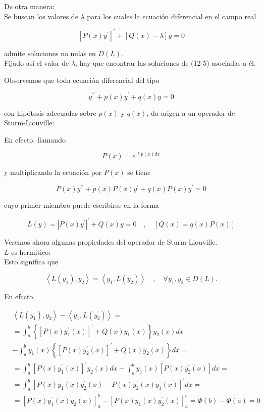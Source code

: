 \documentclass[10pt]{article}
\theoremstyle{plain}
\theoremstyle{definition}
\theoremstyle{remark}
\begin{document}
De otra manera:\\
Se buscan los valores de $\lambda$ para los cuales la ecuación diferencial en el campo real


\begin{equation*}
\left[P(x) y^{\prime}\right]^{\prime}+[Q(x)-\lambda] y=0 \tag{12-5}
\end{equation*}


admite soluciones no nulas en $D(L)$.\\
Fijado así el valor de $\lambda$, hay que encontrar las soluciones de (12-5) asociadas a él.

Observemos que toda ecuación diferencial del tipo

$$
y^{\prime \prime}+p(x) y^{\prime}+q(x) y=0
$$

con hipótesis adecuadas sobre $p(x)$ y $q(x)$, da origen a un operador de Sturm-Liouville:

En efecto, llamando

$$
P(x)=e^{\int p(x) d x}
$$

y multiplicando la ecuación por $P(x)$ se tiene

$$
P(x) y^{\prime \prime}+p(x) P(x) y^{\prime}+q(x) P(x) y^{\prime}=0
$$

cuyo primer miembro puede escribirse en la forma

$$
L(y)=\left|P(x) y^{\prime}\right|^{\prime}+Q(x) y=0 \quad, \quad[Q(x)=q(x) P(x)]
$$

Veremos ahora algunas propiedades del operador de Sturm-Liouville.\\
$L$ es hermitico:\\
Esto significa que

$$
\left\langle L\left(y_{1}\right), y_{2}\right\rangle=\left\langle y_{1}, L\left(y_{2}\right)\right\rangle \quad, \quad \forall y_{1}, y_{2} \in D(L) .
$$

En efccto,

$$
\begin{aligned}
& \left\langle L\left(y_{1}\right), y_{2}\right\rangle-\left\langle y_{1}, L\left(y_{2}^{\prime}\right)\right\rangle= \\
& =\int_{a}^{b}\left\{\left[P(x) y_{1}^{\prime}(x)\right]^{\prime}+Q(x) y_{1}(x)\right\} y_{2}(x) d x \\
& -\int_{a}^{b} y_{1}(x)\left\{\left[P(x) y_{2}^{\prime}(x)\right]^{\prime}+Q(x) y_{2}(x)\right\} d x= \\
& =\int_{a}^{b}\left[P(x) y_{1}^{\prime}(x)\right]^{\prime} y_{2}(x) d x-\int_{a}^{b} y_{1}(x)\left[P(x) y_{2}^{\prime}(x)\right] d x= \\
& =\int_{a}^{b}\left[P(x) y_{1}^{\prime}(x) y_{2}^{\prime}(x)-P(x) y_{2}^{\prime}(x) y_{1}(x)\right]^{\prime} d x= \\
& =\left[P(x) y_{1}^{\prime}(x) y_{2}(x)\right]_{a}^{b}-\left[P(x) y_{1}(x) y_{2}^{\prime}(x)\right]_{a}^{b}=\Phi(b)-\Phi(a)=0
\end{aligned}
$$
\end{document}

